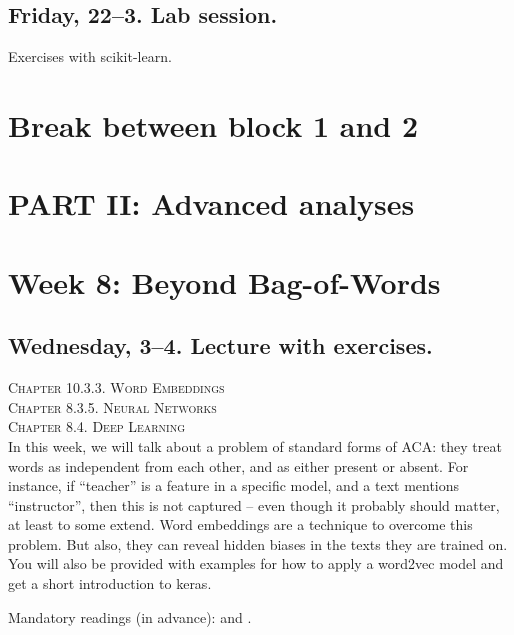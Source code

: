 \subsection*{Friday, 22--3. Lab session.}
Exercises with scikit-learn.




\section*{Break between block 1 and 2}




\section*{PART II: Advanced analyses}


\section*{Week 8: Beyond Bag-of-Words}

\subsection*{Wednesday, 3--4. Lecture with exercises.}
\textsc{ Chapter 10.3.3. Word Embeddings}\\
\textsc{ Chapter 8.3.5. Neural Networks}\\
\textsc{ Chapter 8.4. Deep Learning}\\

In this week, we will talk about a problem of standard forms of ACA: they treat words as independent from each other, and as either present or absent. For instance, if ``teacher'' is a feature in a specific model, and a text mentions ``instructor'', then this is not captured -- even though it probably should matter, at least to some extend. Word embeddings are a technique to overcome this problem. But also, they can reveal hidden biases in the texts they are trained on. You will also be provided with examples for how to apply a word2vec model and get a short introduction to keras.

Mandatory readings (in advance): \cite{Kusner2015} and \cite{Garg2017}.





